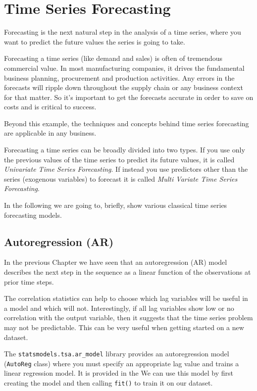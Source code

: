 \chapter{Time Series Forecasting}\label{time-series-forecasting}

Forecasting is the next natural step in the analysis of a time series,
where you want to predict the future values the series is going to take.

Forecasting a time series (like demand and sales) is often of tremendous
commercial value. In most manufacturing companies, it drives the
fundamental business planning, procurement and production activities.
Any errors in the forecasts will ripple down throughout the supply chain
or any business context for that matter. So it's important to get the
forecasts accurate in order to save on costs and is critical to success.

Beyond this example, the techniques and concepts behind time series
forecasting are applicable in any business.

Forecasting a time series can be broadly divided into two types. If you
use only the previous values of the time series to predict its future
values, it is called \emph{Univariate Time Series Forecasting}. If
instead you use predictors other than the series (exogenous
variables) to forecast it is called
\emph{Multi Variate Time Series Forecasting}.

In the following we are going to, briefly, show various classical time
series forecasting models.

\section{Autoregression (AR)}\label{autoregression-ar}

In the previous Chapter we have seen that an autoregression (AR) model
describes the next step in the sequence as a linear function of the
observations at prior time steps.


The correlation statistics can help to choose which lag variables
will be useful in a model and which will not. Interestingly, if all lag
variables show low or no correlation with the output variable, then it
suggests that the time series problem may not be predictable. This can
be very useful when getting started on a new dataset.

The \texttt{statsmodels.tsa.ar\_model} library provides an
autoregression model (\texttt{AutoReg}
class) where you must specify an appropriate lag value and
trains a linear regression model. It is provided in the  We can use this model by first creating the model and then
calling \texttt{fit()} to train it on our dataset. 

